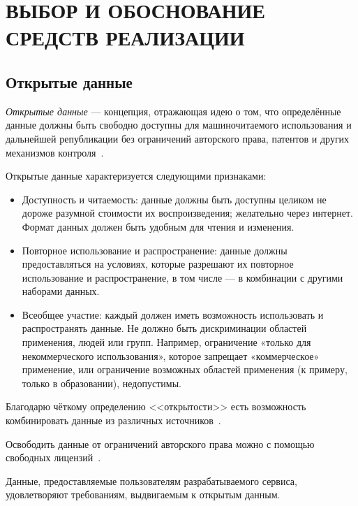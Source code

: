 \section[Выбор и обоснование средств реализации]{ВЫБОР И ОБОСНОВАНИЕ \\ СРЕДСТВ РЕАЛИЗАЦИИ}
\label{sec:choice}

\subsection{Открытые данные}
\label{ssec:choice_opendata}

\textit{Открытые данные} --- концепция, отражающая идею о том, что определённые данные
должны быть свободно доступны для машиночитаемого использования и дальнейшей републикации без
ограничений авторского права, патентов и других механизмов контроля~\cite{wiki_opendata}.

Открытые данные характеризуется следующими признаками:
\begin{itemize}

\item
Доступность и читаемость: данные должны быть доступны целиком не дороже
разумной стоимости их воспроизведения; желательно через интернет.
Формат данных должен быть удобным для чтения и изменения.

\item
Повторное использование и распространение: данные должны предоставляться на условиях,
которые разрешают их повторное использование и распространение,
в том числе --- в комбинации с другими наборами данных.

\item
Всеобщее участие: каждый должен иметь возможность использовать и распространять данные.
Не должно быть дискриминации областей применения, людей или групп.
Например, ограничение «только для некоммерческого использования»,
которое запрещает «коммерческое» применение, или ограничение возможных областей применения
(к примеру, только в образовании), недопустимы.

\end{itemize}

Благодарю чёткому определению <<открытости>> есть возможность комбинировать данные
из различных источников~\cite{opendatahandbook_open_data}.

Освободить данные от ограничений авторского права можно с помощью свободных
лицензий~\cite{wiki_opendata}.

Данные, предоставляемые пользователям разрабатываемого сервиса, удовлетворяют требованиям, 
выдвигаемым к открытым данным.


